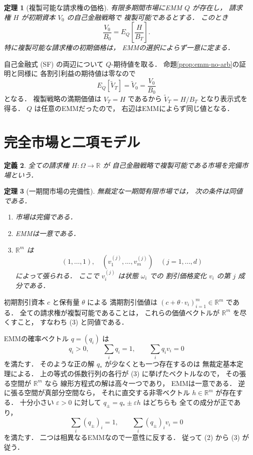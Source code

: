 \documentclass[a5paper,10pt,onecolumn]{jsarticle}
\makeatletter
\theoremstyle{mathnotetheorem}
\newtheorem{theorem}{定理}[section]
\newtheorem{definition}[theorem]{定義}
\renewcommand{\proofname}{証明}
\renewenvironment{proof}[1][\proofname]{%
  \par\pushQED{\qed}\normalfont\topsep4\p@\@plus2\p@\relax
  \trivlist\item[\hskip\labelsep\bfseries #1]\ignorespaces
}{\popQED\endtrivlist\@endpefalse}
\makeatother
\begin{document}
\begin{theorem}[複製可能な請求権の価格]\label{thm:replication}
有限多期間市場にEMM $Q$ が存在し，
請求権 $H$ が初期資本 $V_0$ の自己金融戦略で
複製可能であるとする．
このとき
\[
 \frac{V_0}{B_0}=E_Q\left[\frac H{B_T}\right].
\]
特に複製可能な請求権の初期価格は，
EMMの選択によらず一意に定まる．
\end{theorem}
\begin{proof}
自己金融式 (SF) の両辺について
$Q$-期待値を取る．
命題\ref{prop:emm-no-arb}の証明と同様に
各割引利益の期待値は零なので
\[
 E_Q[\widetilde V_T]=\widetilde V_0=\frac{V_0}{B_0}
\]
となる．
複製戦略の満期価値は $V_T=H$ であるから
$\widetilde V_T=H/B_T$ となり表示式を得る．
$Q$ は任意のEMMだったので，
右辺はEMMによらず同じ値となる．
\end{proof}

\section{完全市場と二項モデル}

\begin{definition}
全ての請求権 $H:\Omega\to\mathbb R$ が
自己金融戦略で複製可能である市場を\emph{完備市場}という．
\end{definition}

\begin{theorem}[一期間市場の完備性]\label{thm:complete-oneperiod}
無裁定な一期間有限市場では，
次の条件は同値である．
\begin{enumerate}
\item 市場は完備である．
\item EMMは一意である．
\item $\mathbb R^m$ は
\[
 (1,\dots,1),\quad
 (v_1^{(j)},\dots,v_m^{(j)})\quad(j=1,\dots,d)
\]
によって張られる．
ここで $v_i^{(j)}$ は状態 $\omega_i$ での
割引価格変化 $v_i$ の第 $j$ 成分である．
\end{enumerate}
\end{theorem}
\begin{proof}
初期割引資本 $c$ と保有量 $\theta$ による
満期割引価値は
$(c+\theta\cdot v_i)_{i=1}^m\in\mathbb R^m$
である．
全ての請求権が複製可能であることは，
これらの価値ベクトルが $\mathbb R^m$ を尽くすこと，
すなわち (3) と同値である．

EMMの確率ベクトル $q=(q_i)$ は
\[
 q_i>0,\qquad\sum_iq_i=1,\qquad
 \sum_iq_iv_i=0
\]
を満たす．
そのような正の解 $q_*$ が少なくとも一つ存在するのは
無裁定基本定理による．
上の等式の係数行列の各行が
(3) に挙げたベクトルなので，
その張る空間が $\mathbb R^m$ なら
線形方程式の解は高々一つであり，
EMMは一意である．
逆に張る空間が真部分空間なら，
それに直交する非零ベクトル $h\in\mathbb R^m$ が存在する．
十分小さい $\varepsilon>0$ に対して
$q_\pm=q_*\pm\varepsilon h$ はどちらも
全ての成分が正であり，
\[
 \sum_i(q_\pm)_i=1,\qquad
 \sum_i(q_\pm)_iv_i=0
\]
を満たす．
二つは相異なるEMMなので一意性に反する．
従って (2) から (3) が従う．
\end{proof}
\end{document}
